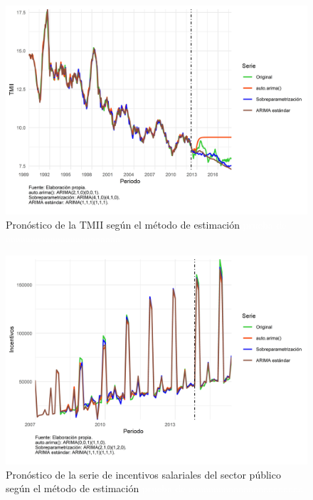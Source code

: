 \documentclass[
]{article}
\begin{document}
\begin{figure}[H]
\includegraphics[width=1\linewidth,height=1\textheight]{Tesis_files/figure-latex/pronostico_TMII-1} \caption{Pronóstico de la TMII según el método de estimación \textcolor{white}{prueba de aaaaaaaaaaaaaaaaaaaaaaa}}\label{fig:pronostico_TMII}
\end{figure}

\begin{figure}[H]
\includegraphics[width=1\linewidth,height=1\textheight]{Tesis_files/figure-latex/pronostico_INCENTIVOS-1} \caption{Pronóstico de la serie de incentivos salariales del sector público según el método de estimación \textcolor{white}{prueba de aaaaaaaaaaaaaaaaaaaaaaa}}\label{fig:pronostico_INCENTIVOS}
\end{figure}
\end{document}

